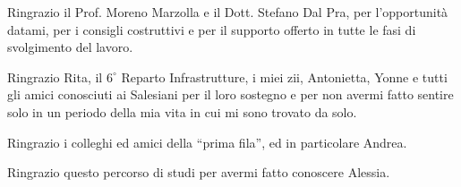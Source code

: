 Ringrazio il Prof. Moreno Marzolla e il Dott. Stefano Dal Pra, per
l'opportunità datami, per i consigli costruttivi e per il supporto offerto in
tutte le fasi di svolgimento del lavoro.

\mbox{}

Ringrazio Rita, il $6^\circ$ Reparto Infrastrutture, i miei zii, Antonietta,
Yonne e tutti gli amici conosciuti ai Salesiani per il loro sostegno e per non
avermi fatto sentire solo in un periodo della mia vita in cui mi sono trovato
da solo.

\mbox{}

Ringrazio i colleghi ed amici della ``prima fila'', ed in particolare Andrea.

\mbox{}

Ringrazio questo percorso di studi per avermi fatto conoscere Alessia.
